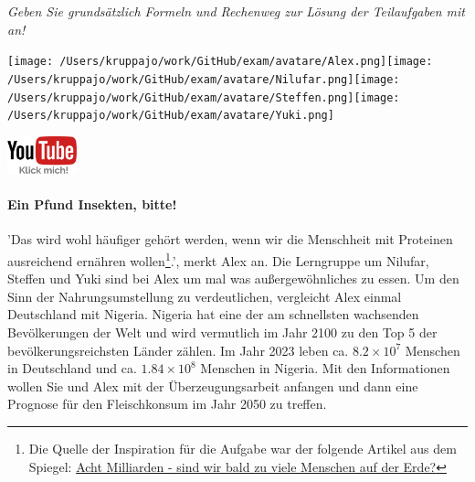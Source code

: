 \documentclass[a4paper, 9pt]{scrartcl}\usepackage[]{graphicx}\usepackage[]{xcolor}
\begin{document}
\textit{Geben Sie grundsätzlich Formeln und Rechenweg zur Lösung der Teilaufgaben mit an!} \\[1Ex]
 

 
\ifcollection
\begin{flushright}
\tiny\vspace{-3Ex}
\textbf{\examinhaltstart}
\exammodulemathstat
\vspace{-4Ex}
\end{flushright}
\begin{minipage}[t]{0.5\textwidth}
\texttt{[image: /Users/kruppajo/work/GitHub/exam/avatare/Alex.png]}\hspace{-4mm}\texttt{[image: /Users/kruppajo/work/GitHub/exam/avatare/Nilufar.png]}\hspace{-4mm}\texttt{[image: /Users/kruppajo/work/GitHub/exam/avatare/Steffen.png]}\hspace{-4mm}\texttt{[image: /Users/kruppajo/work/GitHub/exam/avatare/Yuki.png]}
\end{minipage}
\begin{minipage}[t]{0.5\textwidth}
\hfill
\href{https://youtu.be/OhyuH6hzEhY}{\includegraphics[width = 2cm]{img/youtube}}
\end{minipage}
\fi







\ifcollection
\paragraph{Ein Pfund Insekten, bitte!} 
\fi

'Das wird wohl häufiger gehört werden, wenn wir die Menschheit mit Proteinen ausreichend ernähren wollen\footnote{Die Quelle der Inspiration für die Aufgabe war der folgende Artikel aus dem Spiegel: \href{https://www.spiegel.de/ausland/ueberbevoelkerung-acht-milliarden-sind-wir-bald-zu-viele-menschen-auf-der-erde-a-3f20c7bc-3d60-4440-9f52-eb338db207f5}{Acht Milliarden - sind wir bald zu viele Menschen auf der Erde?}}.', merkt Alex an. Die Lerngruppe um Nilufar, Steffen und Yuki sind bei Alex um mal was außergewöhnliches zu essen. Um den Sinn der Nahrungsumstellung zu verdeutlichen, vergleicht Alex einmal Deutschland mit Nigeria. Nigeria hat eine der am schnellsten wachsenden Bevölkerungen der Welt und wird vermutlich im Jahr 2100 zu den Top 5 der bevölkerungsreichsten Länder zählen. Im Jahr 2023 leben ca. \ensuremath{8.2\times 10^{7}} Menschen in Deutschland und ca. \ensuremath{1.84\times 10^{8}} Menschen in Nigeria. Mit den Informationen wollen Sie und Alex mit der Überzeugungsarbeit anfangen und dann eine Prognose für den Fleischkonsum im Jahr 2050 zu treffen. \\ 
\end{document}
